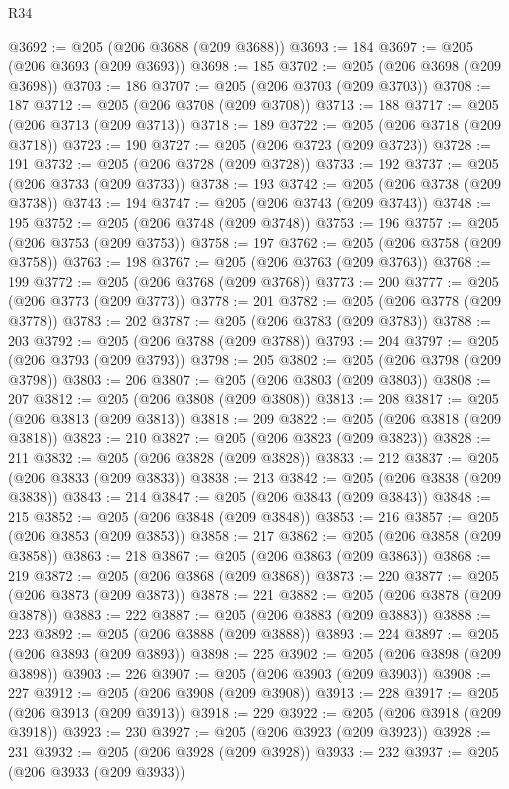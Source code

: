 \begin{lexlean}{R34}
\begin{coremodule}
@3692 := @205 (@206 @3688 (@209 @3688))
@3693 := 184
@3697 := @205 (@206 @3693 (@209 @3693))
@3698 := 185
@3702 := @205 (@206 @3698 (@209 @3698))
@3703 := 186
@3707 := @205 (@206 @3703 (@209 @3703))
@3708 := 187
@3712 := @205 (@206 @3708 (@209 @3708))
@3713 := 188
@3717 := @205 (@206 @3713 (@209 @3713))
@3718 := 189
@3722 := @205 (@206 @3718 (@209 @3718))
@3723 := 190
@3727 := @205 (@206 @3723 (@209 @3723))
@3728 := 191
@3732 := @205 (@206 @3728 (@209 @3728))
@3733 := 192
@3737 := @205 (@206 @3733 (@209 @3733))
@3738 := 193
@3742 := @205 (@206 @3738 (@209 @3738))
@3743 := 194
@3747 := @205 (@206 @3743 (@209 @3743))
@3748 := 195
@3752 := @205 (@206 @3748 (@209 @3748))
@3753 := 196
@3757 := @205 (@206 @3753 (@209 @3753))
@3758 := 197
@3762 := @205 (@206 @3758 (@209 @3758))
@3763 := 198
@3767 := @205 (@206 @3763 (@209 @3763))
@3768 := 199
@3772 := @205 (@206 @3768 (@209 @3768))
@3773 := 200
@3777 := @205 (@206 @3773 (@209 @3773))
@3778 := 201
@3782 := @205 (@206 @3778 (@209 @3778))
@3783 := 202
@3787 := @205 (@206 @3783 (@209 @3783))
@3788 := 203
@3792 := @205 (@206 @3788 (@209 @3788))
@3793 := 204
@3797 := @205 (@206 @3793 (@209 @3793))
@3798 := 205
@3802 := @205 (@206 @3798 (@209 @3798))
@3803 := 206
@3807 := @205 (@206 @3803 (@209 @3803))
@3808 := 207
@3812 := @205 (@206 @3808 (@209 @3808))
@3813 := 208
@3817 := @205 (@206 @3813 (@209 @3813))
@3818 := 209
@3822 := @205 (@206 @3818 (@209 @3818))
@3823 := 210
@3827 := @205 (@206 @3823 (@209 @3823))
@3828 := 211
@3832 := @205 (@206 @3828 (@209 @3828))
@3833 := 212
@3837 := @205 (@206 @3833 (@209 @3833))
@3838 := 213
@3842 := @205 (@206 @3838 (@209 @3838))
@3843 := 214
@3847 := @205 (@206 @3843 (@209 @3843))
@3848 := 215
@3852 := @205 (@206 @3848 (@209 @3848))
@3853 := 216
@3857 := @205 (@206 @3853 (@209 @3853))
@3858 := 217
@3862 := @205 (@206 @3858 (@209 @3858))
@3863 := 218
@3867 := @205 (@206 @3863 (@209 @3863))
@3868 := 219
@3872 := @205 (@206 @3868 (@209 @3868))
@3873 := 220
@3877 := @205 (@206 @3873 (@209 @3873))
@3878 := 221
@3882 := @205 (@206 @3878 (@209 @3878))
@3883 := 222
@3887 := @205 (@206 @3883 (@209 @3883))
@3888 := 223
@3892 := @205 (@206 @3888 (@209 @3888))
@3893 := 224
@3897 := @205 (@206 @3893 (@209 @3893))
@3898 := 225
@3902 := @205 (@206 @3898 (@209 @3898))
@3903 := 226
@3907 := @205 (@206 @3903 (@209 @3903))
@3908 := 227
@3912 := @205 (@206 @3908 (@209 @3908))
@3913 := 228
@3917 := @205 (@206 @3913 (@209 @3913))
@3918 := 229
@3922 := @205 (@206 @3918 (@209 @3918))
@3923 := 230
@3927 := @205 (@206 @3923 (@209 @3923))
@3928 := 231
@3932 := @205 (@206 @3928 (@209 @3928))
@3933 := 232
@3937 := @205 (@206 @3933 (@209 @3933))

\end{coremodule}
\end{lexlean}
